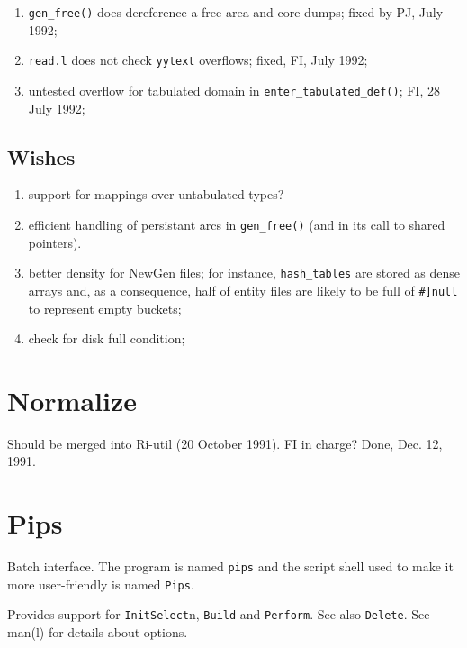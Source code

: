 \begin{enumerate}
  \item	\verb+gen_free()+ does dereference a free area and core dumps;
	fixed by PJ, July 1992;

  \item \verb+read.l+ does not check \verb+yytext+ overflows; fixed, FI,
	July 1992;

  \item untested overflow for tabulated domain in \verb+enter_tabulated_def()+;
	FI, 28 July 1992;

\end{enumerate}

\subsection{Wishes}

\begin{enumerate}

  \item support for mappings over untabulated types?

  \item efficient handling of persistant arcs in \verb+gen_free()+
	(and in its call to shared pointers).

  \item better density for NewGen files; for instance, \verb+hash_tables+ are
	stored as dense arrays and, as a consequence, half of entity files
	are likely to be full of \verb+#]null+ to represent empty buckets;

  \item check for disk full condition; 

\end{enumerate}

\section{Normalize}

Should be merged into Ri-util (20 October 1991). FI in charge? Done,
Dec. 12, 1991.

\newpage

\section{Pips}

Batch interface. The program is named \verb+pips+ and the script shell
used to make it more user-friendly is named \verb+Pips+.

Provides support for \verb+Init+\verb+Select+n, \verb+Build+ and
\verb+Perform+. See also \verb+Delete+. See man(l) for details about options.

